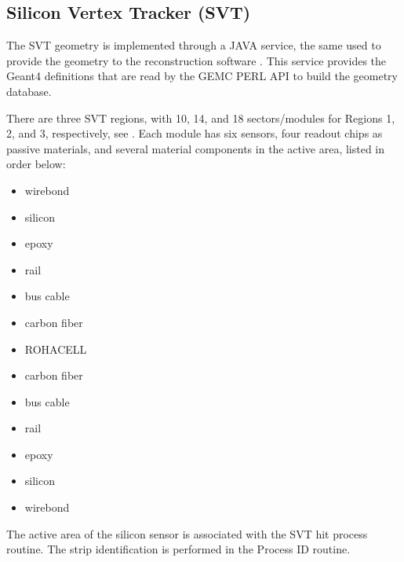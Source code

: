 \subsection{Silicon Vertex Tracker (SVT)}

The SVT \cite{svt-nim} geometry is implemented through a JAVA service, the same used to provide the geometry
to the reconstruction software \cite{recon-nim}. This service provides the Geant4 definitions that are read by the
GEMC PERL API to build the geometry database.

There are three SVT regions, with 10, 14, and 18 sectors/modules for Regions 1, 2, and 3, respectively, see .
Each module has six sensors, four readout chips as passive materials, and several material
components in the active area, listed in order below:

\begin{itemize}
	\item wirebond
	\item silicon
	\item epoxy
	\item rail
	\item bus cable
	\item carbon fiber
	\item ROHACELL
	\item carbon fiber
	\item bus cable
	\item rail
	\item epoxy
	\item silicon
	\item wirebond
\end{itemize}

The active area of the silicon sensor is associated with the SVT hit process routine. The strip identification is performed
in the Process ID routine.

